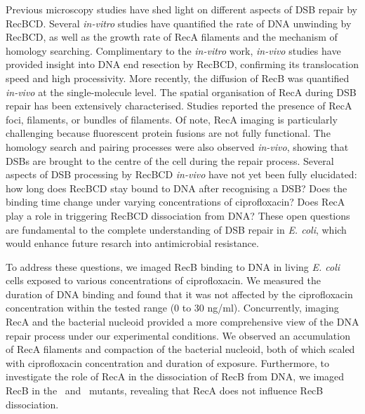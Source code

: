Previous microscopy studies have shed light on different aspects of DSB repair by RecBCD. Several \emph{in-vitro} studies have quantified the rate of DNA unwinding by RecBCD\cite{Spies2003,Liu2013}, as well as the growth rate of RecA filaments\cite{Joo2006,Galletto2006,Handa2009} and the mechanism of homology searching\cite{Forget2012,Ragunathan2012}. Complimentary to the \emph{in-vitro} work, \emph{in-vivo} studies have provided insight into DNA end resection by RecBCD\cite{Wiktor2018}, confirming its translocation speed and high processivity. More recently, the diffusion of RecB was quantified \emph{in-vivo} at the single-molecule level\cite{Lepore2023}. The spatial organisation of RecA during DSB repair has been extensively characterised. Studies reported the presence of RecA foci\cite{Renzette2005,Renzette2007,Centore2007,Amarh2018}, filaments\cite{Kidane2005}, or bundles of filaments\cite{Lesterlin2013,Ghodke2019}. Of note, RecA imaging is particularly challenging because fluorescent protein fusions are not fully functional. The homology search and pairing processes were also observed \emph{in-vivo}, showing that DSBs are brought to the centre of the cell during the repair process\cite{Badrinarayanan2015,Wiktor2021}. Several aspects of DSB processing by RecBCD \emph{in-vivo} have not yet been fully elucidated: how long does RecBCD stay bound to DNA after recognising a DSB? Does the binding time change under varying concentrations of ciprofloxacin? Does RecA play a role in triggering RecBCD dissociation from DNA? These open questions are fundamental to the complete understanding of DSB repair in \emph{E. coli}, which would enhance future resarch into antimicrobial resistance.

To address these questions, we imaged RecB binding to DNA in living \emph{E. coli} cells exposed to various concentrations of ciprofloxacin. We measured the duration of DNA binding and found that it was not affected by the ciprofloxacin concentration within the tested range (0 to 30 ng/ml). Concurrently, imaging RecA and the bacterial nucleoid provided a more comprehensive view of the DNA repair process under our experimental conditions. We observed an accumulation of RecA filaments and compaction of the bacterial nucleoid, both of which scaled with ciprofloxacin concentration and duration of exposure. Furthermore, to investigate the role of RecA in the dissociation of RecB from DNA, we imaged RecB in the \dreca\ and \teneighty\ mutants, revealing that RecA does not influence RecB dissociation.
